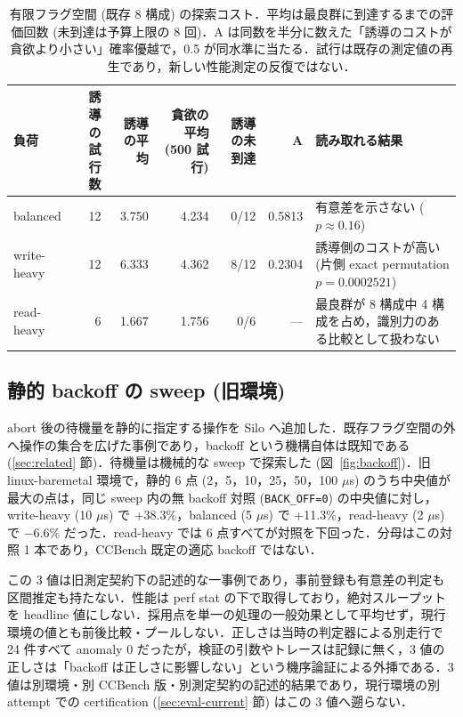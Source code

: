 \documentclass[submit,techrep,noauthor]{ipsj}
\begin{document}
\begin{table}[tb]
\caption{有限フラグ空間 (既存 8 構成) の探索コスト．平均は最良群に到達するまでの評価回数 (未到達は予算上限の 8 回)．A は同数を半分に数えた「誘導のコストが貪欲より小さい」確率優越で，0.5 が同水準に当たる．試行は既存の測定値の再生であり，新しい性能測定の反復ではない．}
\label{tab:search}
\centering
\small
\begin{tabular}{lrrrrrl}
\hline
負荷 & 誘導の試行数 & 誘導の平均 & 貪欲の平均 (500 試行) & 誘導の未到達 & A & 読み取れる結果 \\
\hline
balanced & 12 & 3.750 & 4.234 & 0/12 & 0.5813 & \parbox[t]{40mm}{\raggedright 有意差を示さない ($p \approx 0.16$)} \\
write-heavy & 12 & 6.333 & 4.362 & 8/12 & 0.2304 & \parbox[t]{40mm}{\raggedright 誘導側のコストが高い (片側 exact permutation $p=0.0002521$)} \\
read-heavy & 6 & 1.667 & 1.756 & 0/6 & --- & \parbox[t]{40mm}{\raggedright 最良群が 8 構成中 4 構成を占め，識別力のある比較として扱わない} \\
\hline
\end{tabular}
\end{table}

\subsection{静的 backoff の sweep (旧環境)}\label{sec:eval-backoff}

abort 後の待機量を静的に指定する操作を Silo へ追加した．既存フラグ空間の外へ操作の集合を広げた事例であり，backoff という機構自体は既知である (\ref{sec:related} 節)．待機量は機械的な sweep で探索した (図~\ref{fig:backoff})．旧 linux-baremetal 環境で，静的 6 点 (2，5，10，25，50，100 $\mu$s) のうち中央値が最大の点は，同じ sweep 内の無 backoff 対照 (\texttt{BACK\_OFF=0}) の中央値に対し，write-heavy (10 $\mu$s) で +38.3\%，balanced (5 $\mu$s) で +11.3\%，read-heavy (2 $\mu$s) で $-6.6\%$ だった．read-heavy では 6 点すべてが対照を下回った．分母はこの対照 1 本であり，CCBench 既定の適応 backoff ではない．

この 3 値は旧測定契約下の記述的な一事例であり，事前登録も有意差の判定も区間推定も持たない．性能は perf stat の下で取得しており，絶対スループットを headline 値にしない．採用点を単一の処理の一般効果として平均せず，現行環境の値とも前後比較・プールしない．正しさは当時の判定器による別走行で 24 件すべて anomaly 0 だったが，検証の引数やトレースは記録に無く，3 値の正しさは「backoff は正しさに影響しない」という機序論証による外挿である．3 値は別環境・別 CCBench 版・別測定契約の記述的結果であり，現行環境の別 attempt での certification (\ref{sec:eval-current} 節) はこの 3 値へ遡らない．
\end{document}
